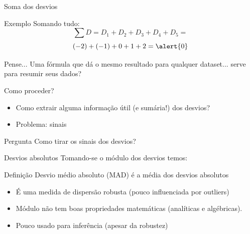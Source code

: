\documentclass{beamer}
\begin{document}
\begin{frame}{\scriptsize Soma dos desvios}
  \begin{exampleblock}{Exemplo}
    \footnotesize
    Somando tudo:
    \begin{displaymath}
    \sum D = D_1 + D_2 + D_3 + D_4 + D_5 =
  \end{displaymath}
  \begin{displaymath}
    (-2) + (-1) + 0 + 1 + 2 = \alert{0}
  \end{displaymath}
  \end{exampleblock}
  \begin{block}{Pense...}
    \footnotesize
    Uma fórmula que dá o mesmo resultado para qualquer dataset... serve para resumir seus dados?
  \end{block}
\end{frame}

\begin{frame}{\scriptsize Como proceder?}
  \begin{itemize}
    \footnotesize
  \item Como extrair alguma informação útil (e sumária!) dos desvios?
  \item Problema: sinais
  \end{itemize}
  \begin{block}{Pergunta}
    \footnotesize
    Como tirar os sinais dos desvios?
  \end{block}
\end{frame}

\begin{frame}{\scriptsize Desvios absolutos}
  Tomando-se o módulo dos desvios temos:

  \begin{block}{Definição}
    Desvio médio absoluto (MAD) é a média dos desvios absolutos
  \end{block}

  \begin{itemize}
    \footnotesize
  \item É uma medida de dispersão robusta (pouco influenciada por
    outliers)
  \item Módulo não tem boas propriedades matemáticas (analíticas e
    algébricas).
  \item Pouco usado para inferência (apesar da robustez)
  \end{itemize}
\end{frame}
\end{document}
